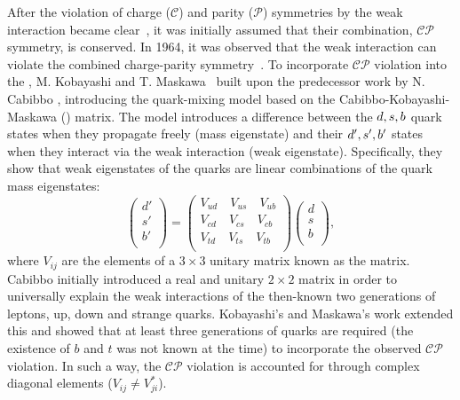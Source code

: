 After the violation of charge ($\mathcal{C}$) and parity ($\mathcal{P}$) symmetries by the weak interaction became clear~\cite{Wu:1957my},
it was initially assumed that their combination, $\mathcal{CP}$ symmetry, is conserved.
In 1964, it was observed that the weak interaction can violate the combined charge-parity symmetry~\cite{Christenson:1964fg}.
To incorporate $\mathcal{CP}$ violation into the \SM, M. Kobayashi and T. Maskawa~\cite{Kobayashi:1973fv} built upon the predecessor work by N. Cabibbo \cite{Cabibbo:1963yz},
introducing the quark-mixing model based on the Cabibbo-Kobayashi-Maskawa (\CKM) matrix. 
The model introduces a difference between the $d,s,b$ quark states when they propagate freely (mass eigenstate) and their $d',s',b'$ states when they interact
via the weak interaction (weak eigenstate).
Specifically, they show that weak eigenstates of the quarks are linear combinations of the quark mass eigenstates:
\begin{equation}
    \begin{pmatrix}
        d'\\
        s'\\
        b'\\
    \end{pmatrix}
    =
    \begin{pmatrix}
        V_{ud} \quad V_{us} \quad V_{ub}\\
        V_{cd} \quad V_{cs} \quad V_{cb}\\
        V_{td} \quad V_{ts} \quad V_{tb}\\
    \end{pmatrix}
    \begin{pmatrix}
        d\\
        s\\
        b\\
    \end{pmatrix},
\end{equation}
where $V_{ij}$ are the elements of a $3\times3$ unitary matrix known as the \CKM matrix.
Cabibbo initially introduced a real and unitary $2\times2$ matrix in order to universally explain the weak interactions of
the then-known two generations of leptons, up, down and strange quarks.
Kobayashi's and Maskawa's work extended this and showed that at least three generations of quarks are required 
(the existence of $b$ and $t$ was not known at the time) to incorporate the observed $\mathcal{CP}$ violation.
In such a way, the $\mathcal{CP}$ violation is accounted for through complex diagonal elements ($V_{ij}\neq V_{ji}^*$).

